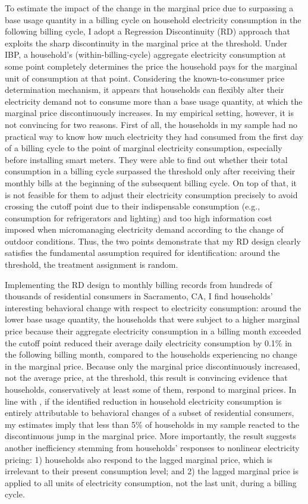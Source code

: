 To estimate the impact of the change in the marginal price due to surpassing a base usage quantity in a billing cycle on household electricity consumption in the following billing cycle, I adopt a Regression Discontinuity (RD) approach that exploits the sharp discontinuity in the marginal price at the threshold. Under IBP, a household's (within-billing-cycle) aggregate electricity consumption at some point completely determines the price the household pays for the marginal unit of consumption at that point. Considering the known-to-consumer price determination mechanism, it appears that households can flexibly alter their electricity demand not to consume more than a base usage quantity, at which the marginal price discontinuously increases. In my empirical setting, however, it is not convincing for two reasons. First of all, the households in my sample had no practical way to know how much electricity they had consumed from the first day of a billing cycle to the point of marginal electricity consumption, especially before installing smart meters. They were able to find out whether their total consumption in a billing cycle surpassed the threshold only after receiving their monthly bills at the beginning of the subsequent billing cycle. On top of that, it is not feasible for them to adjust their electricity consumption precisely to avoid crossing the cutoff point due to their indispensable consumption (e.g., consumption for refrigerators and lighting) and too high information cost imposed when micromanaging electricity demand according to the change of outdoor conditions. Thus, the two points demonstrate that my RD design clearly satisfies the fundamental assumption required for identification: around the threshold, the treatment assignment is random.

Implementing the RD design to monthly billing records from hundreds of thousands of residential consumers in Sacramento, CA, I find households' interesting behavioral change with respect to electricity consumption: around the lower base usage quantity, the households that were subject to a higher marginal price because their aggregate electricity consumption in a billing month exceeded the cutoff point reduced their average daily electricity consumption by 0.1\% in the following billing month, compared to the households experiencing no change in the marginal price. Because only the marginal price discontinuously increased, not the average price, at the threshold, this result is convincing evidence that households, conservatively at least some of them, respond to marginal prices. In line with \cite{Misunderstanding-Nonlinear-Prices_2020_(Shaffer)}, if the identified reduction in household electricity consumption is entirely attributable to behavioral changes of a subset of residential consumers, my estimates imply that less than 5\% of households in my sample reacted to the discontinuous jump in the marginal price. More importantly, the result suggests another inefficiency stemming from households' responses to nonlinear electricity pricing: 1) households also respond to the lagged marginal price, which is irrelevant to their present consumption level; and 2) the lagged marginal price is applied to all units of electricity consumption, not the last unit, during a billing cycle. 

